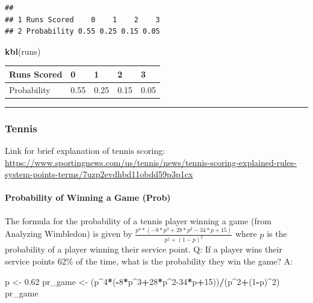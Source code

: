 \documentclass[]{article}
\newenvironment{Shaded}{\begin{snugshade}}{\end{snugshade}}
\newcommand{\DecValTok}[1]{\textcolor[rgb]{0.00,0.00,0.81}{#1}}
\newcommand{\FloatTok}[1]{\textcolor[rgb]{0.00,0.00,0.81}{#1}}
\newcommand{\KeywordTok}[1]{\textcolor[rgb]{0.13,0.29,0.53}{\textbf{#1}}}
\newcommand{\NormalTok}[1]{#1}
\newcommand{\OperatorTok}[1]{\textcolor[rgb]{0.81,0.36,0.00}{\textbf{#1}}}
\newcommand{\StringTok}[1]{\textcolor[rgb]{0.31,0.60,0.02}{#1}}
\let\oldparagraph\paragraph
\renewcommand{\paragraph}[1]{\oldparagraph{#1}\mbox{}}
\begin{document}
\begin{verbatim}
##                                  
## 1 Runs Scored    0    1    2    3
## 2 Probability 0.55 0.25 0.15 0.05
\end{verbatim}

\begin{Shaded}
\begin{Highlighting}[]
\KeywordTok{kbl}\NormalTok{(runs)}
\end{Highlighting}
\end{Shaded}

\begin{tabular}[t]{l|l|l|l|l}
\hline
Runs Scored & 0 & 1 & 2 & 3\\
\hline
Probability & 0.55 & 0.25 & 0.15 & 0.05\\
\hline
\end{tabular}

\begin{center}\rule{0.5\linewidth}{\linethickness}\end{center}

\hypertarget{tennis}{%
\subsubsection{Tennis}\label{tennis}}

Link for brief explanation of tennis scoring:
\url{https://www.sportingnews.com/us/tennis/news/tennis-scoring-explained-rules-system-points-terms/7uzp2evdhbd11obdd59p3p1cx}

\hypertarget{probability-of-winning-a-game-prob}{%
\paragraph{Probability of Winning a Game
(Prob)}\label{probability-of-winning-a-game-prob}}

The formula for the probability of a tennis player winning a game (from
Analyzing Wimbledon) is given by
\(\frac{p^4*(-8*p^3+28*p^2-34*p+15)}{p^2+(1-p)^2}\) where \(p\) is the
probability of a player winning their service point. Q: If a player wins
their service points 62\% of the time, what is the probability they win
the game? A:

\begin{Shaded}
\begin{Highlighting}[]
\NormalTok{p <-}\StringTok{ }\FloatTok{0.62}
\NormalTok{pr_game <-}\StringTok{ }\NormalTok{(p}\OperatorTok{^}\DecValTok{4}\OperatorTok{*}\NormalTok{(}\OperatorTok{-}\DecValTok{8}\OperatorTok{*}\NormalTok{p}\OperatorTok{^}\DecValTok{3}\OperatorTok{+}\DecValTok{28}\OperatorTok{*}\NormalTok{p}\OperatorTok{^}\DecValTok{2-34}\OperatorTok{*}\NormalTok{p}\OperatorTok{+}\DecValTok{15}\NormalTok{))}\OperatorTok{/}\NormalTok{(p}\OperatorTok{^}\DecValTok{2}\OperatorTok{+}\NormalTok{(}\DecValTok{1}\OperatorTok{-}\NormalTok{p)}\OperatorTok{^}\DecValTok{2}\NormalTok{)}
\NormalTok{pr_game}
\end{Highlighting}
\end{Shaded}
\end{document}
